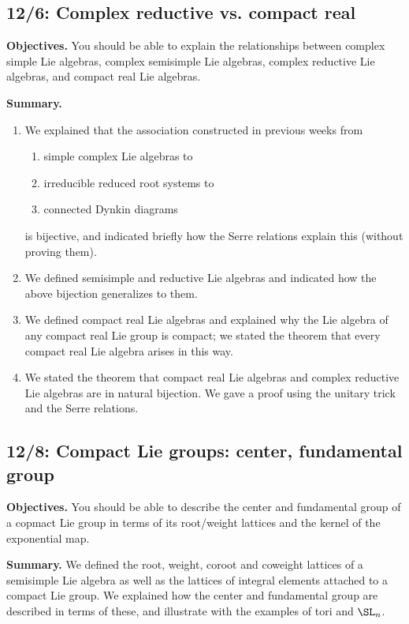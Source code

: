 \documentclass[reqno]{amsart} 
\begin{document}
\newpage
\subsection{12/6: Complex reductive vs. compact real}
\label{sec:orge92c104}
\textbf{Objectives.} You should be able to explain the relationships between
complex simple Lie algebras, complex semisimple Lie algebras, complex
reductive Lie algebras, and compact real Lie algebras.

\textbf{Summary.}
\begin{enumerate}
\item We explained that the association constructed in previous weeks
from
\begin{enumerate}
\item simple complex Lie algebras to
\item irreducible reduced root systems to
\item connected Dynkin diagrams
\end{enumerate}
is bijective, and indicated briefly how the Serre relations explain
this (without proving them).
\item We defined semisimple and reductive Lie algebras and indicated how
the above bijection generalizes to them.
\item We defined compact real Lie algebras and explained why the Lie
algebra of any compact real Lie group is compact; we stated the
theorem that every compact real Lie algebra arises in this way.
\item We stated the theorem that compact real Lie algebras and complex
reductive Lie algebras are in natural bijection.  We gave a proof
using the unitary trick and the Serre relations.
\end{enumerate}
\subsection{12/8: Compact Lie groups: center, fundamental group}
\label{sec:org291b534}
\textbf{Objectives.} You should be able to describe the center and
fundamental group of a copmact Lie group in terms of its root/weight
lattices and the kernel of the exponential map.

\textbf{Summary.} We defined the root, weight, coroot and coweight lattices
of a semisimple Lie algebra as well as the lattices of integral
elements attached to a compact Lie group.  We explained how the
center and fundamental group are described in terms of these, and
illustrate with the examples of tori and \(\SL_n\).
\end{document}
